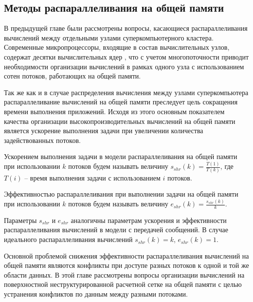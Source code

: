
\subsection{Методы распараллеливания на общей памяти}

В предыдущей главе были рассмотрены вопросы, касающиеся распараллеливания вычислений между отдельными узлами суперкомпьютерного кластера.
Современные микропроцессоры, входящие в состав вычислительных узлов, содержат десятки вычислительных ядер \cite{Section3IntroIntel,Section3IntroAMD,Kuzminsky2022ARM}, что с учетом многопоточности приводит необходимости организации вычислений в рамках одного узла с использованием сотен потоков, работающих на общей памяти.

Так же как и в случае распределения вычисления между узлами суперкомпьютера распараллеливание вычислений на общей памяти преследует цель сокращения времени выполнения приложений.
Исходя из этого основным показателем качества организации высокопроизводительных вычислений на общей памяти является ускорение выполнения задачи при увеличении количества задействованных потоков.

\begin{definition}
Ускорением выполнения задачи в модели распараллеливания на общей памяти\label{term:shr_speedup} при использовании $k$ потоков будем называть величину $s_{shr}(k) = \frac{T(1)}{T(k)}$, где $T(i)$ -- время выполнения задачи с использованием $i$ потоков.
\end{definition}

\begin{definition}
Эффективностью распараллеливания при выполнении задачи на общей памяти\label{term:shr_eff} при использовании $k$ потоков будем называть величину $e_{shr}(k) = \frac{s_{shr}(k)}{k}$.
\end{definition}

Параметры $s_{shr}$ и $e_{shr}$ аналогичны параметрам ускорения\label{term:msg_speedup3} и эффективности\label{term:msg_eff3} распараллеливания вычислений в модели с передачей сообщений.
В случае идеального распараллеливания вычислений $s_{shr}(k) = k$, $e_{shr}(k) = 1$.

Основной проблемой снижения эффективности распараллеливания вычислений на общей памяти являются конфликты при доступе разных потоков к одной и той же области данных.
В этой главе рассмотрены вопросы организации вычислений на поверхностной неструктурированной расчетной сетке\label{term:unstruct_surf_calc_mesh6} на общей памяти с целью устранения конфликтов по данным между разными потоками.

